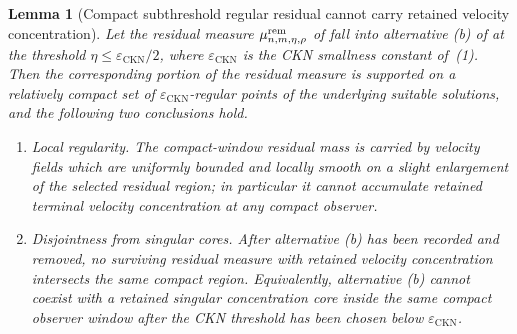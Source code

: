 \documentclass[11pt]{amsart}
\numberwithin{equation}{section}
\theoremstyle{plain}
\newtheorem{lemma}[lemma]{Lemma}
\theoremstyle{definition}
\theoremstyle{remark}
\newcommand{\eps}{\varepsilon}
\newcommand{\CKN}{\mathrm{CKN}}
\begin{document}
\begin{lemma}[Compact subthreshold regular residual cannot carry retained velocity concentration]
\label{lem:compact-subthreshold-regular-residual}
Let the residual measure
\(\mu_{n,m,\eta,\rho}^{\rm rem}\) of
 fall into alternative \textup{(b)}
of  at the threshold
\(\eta\le\eps_{\CKN}/2\), where \(\eps_{\CKN}\) is the CKN smallness constant
of \,(1).  Then the corresponding portion of
the residual measure is supported on a relatively compact set of
\(\eps_{\CKN}\)-regular points of the underlying suitable solutions, and the
following two conclusions hold.
\begin{enumerate}[label=\textup{(\roman*)}]
   \item \emph{Local regularity.}  The compact-window residual mass is
   carried by velocity fields which are uniformly bounded and locally
   smooth on a slight enlargement of the selected residual region; in
   particular it cannot accumulate retained terminal velocity concentration
   at any compact observer.
   \item \emph{Disjointness from singular cores.}  After alternative
   \textup{(b)} has been recorded and removed, no surviving residual
   measure with retained velocity concentration intersects the same compact
   region.  Equivalently, alternative \textup{(b)} cannot coexist with a
   retained singular concentration core inside the same compact observer
   window after the CKN threshold has been chosen below \(\eps_{\CKN}\).
\end{enumerate}
\end{lemma}
\end{document}
